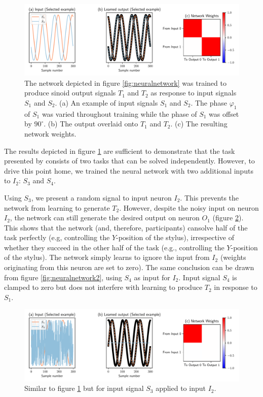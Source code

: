 \documentclass[11pt]{article}
\begin{document}
\begin{figure}
	\centering
	\includegraphics[width=1\linewidth]{neural_network_0}
	\caption{The network depicted in figure \ref{fig:neuralnetwork} was trained to produce sinoid output signals $T_1$ and $T_2$ as response to input signals $S_1$ and $S_2$. (a) An example of input signals $S_1$ and $S_2$. The phase $\varphi_1$ of $S_1$ was varied throughout training while the phase of $S_1$ was offset by $90^\circ$. (b) The output overlaid onto $T_1$ and $T_2$. (c) The resulting network weights.}
	\label{fig:neuralnetwork0}
\end{figure}

The results depicted in figure \ref{fig:neuralnetwork0} are sufficient to demonstrate that the task presented by \citet{Annand2020} consists of two tasks that can be solved independently. However, to drive this point home, we trained the neural network with two additional inputs to $I_2$: $S_3$ and $S_4$. 

Using $S_3$, we present a random signal to input neuron $I_2$. This prevents the network from learning to generate $T_2$. However, despite the noisy input on neuron $I_2$, the network can still generate the desired output on neuron $O_1$ (figure \ref{fig:neuralnetwork1}). This shows that the network (and, therefore, participants) cansolve half of the task perfectly (e.g, controlling the $Y$-position of the stylus), irrespective of whether they succeed in the other half of the task (e.g., controlling the $Y$-position of the stylus). The network simply learns to ignore the input from $I_2$ (weights originating from this neuron are set to zero). The same conclusion can be drawn from figure  \ref{fig:neuralnetwork2}, using $S_4$ as input for $I_2$. Input signal $S_4$ is clamped to zero but does not interfere with learning to produce $T_2$ in response to $S_1$.

\begin{figure}
	\centering
	\includegraphics[width=1\linewidth]{neural_network_1}
	\caption{Similar to figure \ref{fig:neuralnetwork0} but for input signal $S_3$ applied to input $I_2$.}
	\label{fig:neuralnetwork1}
\end{figure}
\end{document}
